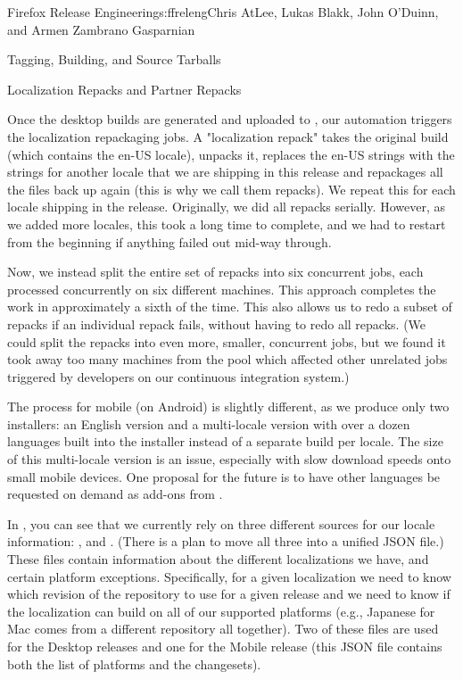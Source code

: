 \begin{aosachapter}{Firefox Release Engineering}{s:ffreleng}{Chris AtLee, Lukas Blakk, John O'Duinn, and Armen Zambrano Gasparnian}
\begin{aosasect1}{Tagging, Building, and Source Tarballs}
\end{aosasect1}

\begin{aosasect1}{Localization Repacks and Partner Repacks}


Once the desktop builds are generated and uploaded to
, our automation triggers the localization
repackaging jobs. A "localization repack" takes the original 
build (which contains the en-US locale), unpacks it, replaces
the en-US strings with the strings for another locale that we
are shipping in this release and repackages all the files back
up again (this is why we call them repacks). We repeat this 
for each locale shipping in the release. Originally, we did all 
repacks serially. However, as we added more locales, this took 
a long time to complete, and we had to restart from the beginning 
if anything failed out mid-way through. 

Now, we instead split the entire set of repacks into
six concurrent jobs, each processed concurrently on six
different machines. This approach completes the work in
approximately a sixth of the time. This also allows us to redo
a subset of repacks if an individual repack fails, without
having to redo all repacks. (We could split the repacks into
even more, smaller, concurrent jobs, but we found it took away
too many machines from the pool which affected other unrelated
jobs triggered by developers on our continuous integration
system.) 
    
The process for mobile (on Android) is slightly different, as we produce
only two installers:  an English version and a multi-locale version 
with over a dozen languages built into the installer
instead of a separate build per locale. The size of this
multi-locale version is an issue, especially with slow
download speeds onto small mobile devices. One proposal for
the future is to have other languages be requested on demand
as add-ons from .

In , you can see that we currently rely
on three different sources for our locale information:
,  and
. (There is a plan to move
all three into a unified JSON file.) These files contain information
about the different localizations we have, and certain platform
exceptions. Specifically, for a given localization we need to know
which revision of the repository to use for a given release and we
need to know if the localization can build on all of our supported
platforms (e.g.,  Japanese for Mac comes from a different repository all
together).  Two of these files are used for the Desktop releases and
one for the Mobile release (this JSON file contains both the list of
platforms and the changesets).


\end{aosasect1}
\end{aosachapter}
